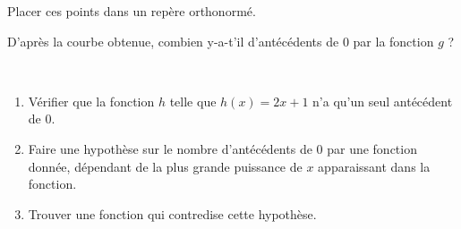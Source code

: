 \documentclass[
	classe=$1^{ere}$STI2D,
	noheader
]{exercice}
\newcommand{\computeg}[1]{
	\fpeval{#1*#1*#1 - 3*#1*#1 - #1 + 3.1}%
}
\begin{document}
{\begin{exercice}
		Placer ces points dans un repère orthonormé. \vspace{0.5em}

		D'après la courbe obtenue, combien y-a-t'il d'antécédents de $0$ par la fonction $g$ ? 


	\end{exercice}

	\begin{exercice}\

		\begin{enumerate}
			\item Vérifier que la fonction $h$ telle que $h(x) = 2x + 1$ n'a qu'un seul antécédent de $0$.
			\item Faire une hypothèse sur le nombre d'antécédents de $0$ par une fonction donnée, dépendant de la plus grande puissance de $x$ apparaissant dans la fonction.

			\item Trouver une fonction qui contredise cette hypothèse. 
		\end{enumerate}
	\end{exercice}
}

\vspace{5em}

\end{document}
